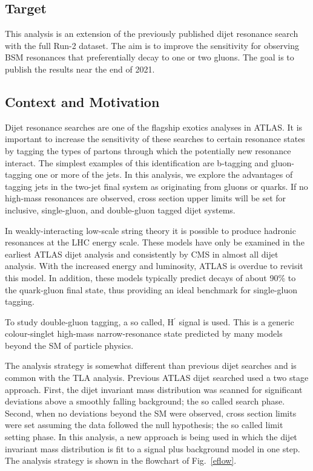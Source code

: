 \subsection{Target}

This analysis is an extension of the previously published dijet
resonance search with the full Run-2 dataset. 
The aim is to improve the sensitivity for observing BSM resonances
that preferentially decay to one or two gluons. 
The goal is to publish the results near the end of 2021.

\subsection{Context and Motivation}

Dijet resonance searches are one of the flagship exotics analyses in
ATLAS.
It is important to increase the sensitivity of these searches to
certain resonance states by tagging the types of partons through which
the potentially new resonance interact.
The simplest examples of this identification are b-tagging and
gluon-tagging one or more of the jets.
In this analysis, we explore the advantages of tagging jets in the
two-jet final system as originating from gluons or quarks.
If no high-mass resonances are observed, cross section upper limits
will be set for inclusive, single-gluon, and double-gluon tagged dijet
systems.

In weakly-interacting low-scale string theory it is possible to
produce hadronic resonances at the LHC energy scale.
These models have only be examined in the earliest ATLAS dijet analysis
and consistently by CMS in almost all dijet analysis.
With the increased energy and luminosity, ATLAS is overdue to revisit
this model.
In addition, these models typically predict decays of about 90\% to
the quark-gluon final state, thus providing an ideal benchmark for
single-gluon tagging.

To study double-gluon tagging, a so called, H$^\prime$ signal is
used.
This is a generic colour-singlet high-mass narrow-resonance state
predicted by many models beyond the SM of particle physics.

The analysis strategy is somewhat different than previous dijet searches
and is common with the TLA analysis.
Previous ATLAS dijet searched used a two stage approach.
First, the dijet invariant mass distribution was scanned for
significant deviations above a smoothly falling background; the so
called search phase.
Second, when no deviations beyond the SM were observed, cross section
limits were set assuming the data followed the null hypothesis; the so
called limit setting phase. 
In this analysis, a new approach is being used in which the dijet
invariant mass distribution is fit to a signal plus background model
in one step. 
The analysis strategy is shown in the flowchart of Fig.~\ref{eflow}.

